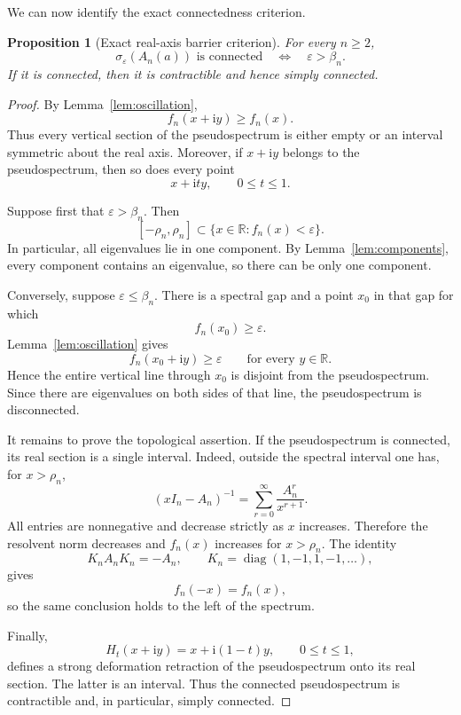 \documentclass[11pt]{article}
\newtheorem{proposition}[theorem]{Proposition}
\begin{document}
We can now identify the exact connectedness criterion.

\begin{proposition}[Exact real-axis barrier criterion]\label{prop:criterion}
For every \(n\ge2\),
\[
\sigma_\varepsilon(A_n(a))
\text{ is connected}
\quad\Longleftrightarrow\quad
\varepsilon>\beta_n.
\]
If it is connected, then it is contractible and hence simply
connected.
\end{proposition}

\begin{proof}
By Lemma~\ref{lem:oscillation},
\[
f_n(x+\mathrm i y)\ge f_n(x).
\]
Thus every vertical section of the pseudospectrum is either empty or
an interval symmetric about the real axis. Moreover, if
\(x+\mathrm i y\) belongs to the pseudospectrum, then so does every
point
\[
x+\mathrm i ty,\qquad 0\le t\le1.
\]

Suppose first that \(\varepsilon>\beta_n\). Then
\[
[-\rho_n,\rho_n]
\subset
\{x\in\mathbb R:f_n(x)<\varepsilon\}.
\]
In particular, all eigenvalues lie in one component. By
Lemma~\ref{lem:components}, every component contains an eigenvalue, so
there can be only one component.

Conversely, suppose \(\varepsilon\le\beta_n\). There is a spectral gap
and a point \(x_0\) in that gap for which
\[
f_n(x_0)\ge\varepsilon.
\]
Lemma~\ref{lem:oscillation} gives
\[
f_n(x_0+\mathrm i y)\ge\varepsilon
\qquad
\text{for every }y\in\mathbb R.
\]
Hence the entire vertical line through \(x_0\) is disjoint from the
pseudospectrum. Since there are eigenvalues on both sides of that
line, the pseudospectrum is disconnected.

It remains to prove the topological assertion. If the pseudospectrum
is connected, its real section is a single interval. Indeed, outside
the spectral interval one has, for \(x>\rho_n\),
\[
(xI_n-A_n)^{-1}
=
\sum_{r=0}^{\infty}\frac{A_n^r}{x^{r+1}}.
\]
All entries are nonnegative and decrease strictly as \(x\) increases.
Therefore the resolvent norm decreases and \(f_n(x)\) increases for
\(x>\rho_n\). The identity
\[
K_nA_nK_n=-A_n,
\qquad
K_n=\operatorname{diag}(1,-1,1,-1,\ldots),
\]
gives
\[
f_n(-x)=f_n(x),
\]
so the same conclusion holds to the left of the spectrum.

Finally,
\[
H_t(x+\mathrm i y)=x+\mathrm i(1-t)y,
\qquad 0\le t\le1,
\]
defines a strong deformation retraction of the pseudospectrum onto
its real section. The latter is an interval. Thus the connected
pseudospectrum is contractible and, in particular, simply connected.
\end{proof}
\end{document}
